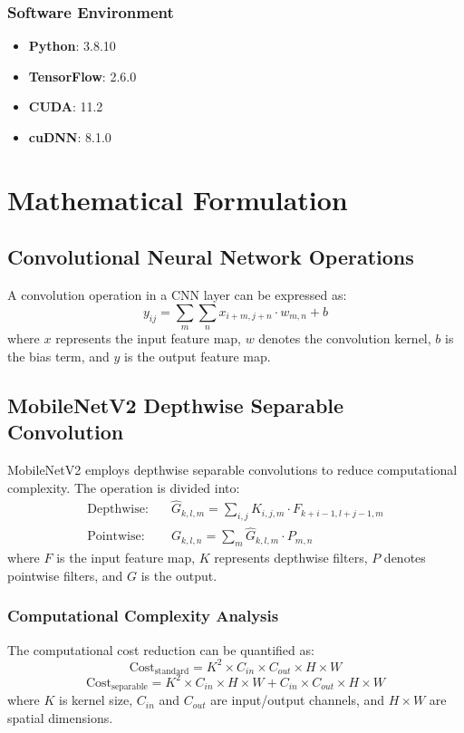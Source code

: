 \documentclass[conference,10pt,letterpaper]{IEEEtran}
\begin{document}
\subsubsection{Software Environment}
\begin{itemize}
\item \textbf{Python}: 3.8.10
\item \textbf{TensorFlow}: 2.6.0
\item \textbf{CUDA}: 11.2
\item \textbf{cuDNN}: 8.1.0
\end{itemize}

\section{Mathematical Formulation}

\subsection{Convolutional Neural Network Operations}

A convolution operation in a CNN layer can be expressed as:
\begin{equation}
y_{ij} = \sum_{m}\sum_{n} x_{i+m,j+n} \cdot w_{m,n} + b
\end{equation}
where $x$ represents the input feature map, $w$ denotes the convolution kernel, $b$ is the bias term, and $y$ is the output feature map.

\subsection{MobileNetV2 Depthwise Separable Convolution}

MobileNetV2 employs depthwise separable convolutions to reduce computational complexity. The operation is divided into:
\begin{align}
\text{Depthwise:} \quad & \hat{G}_{k,l,m} = \sum_{i,j} K_{i,j,m} \cdot F_{k+i-1,l+j-1,m} \\
\text{Pointwise:} \quad & G_{k,l,n} = \sum_{m} \hat{G}_{k,l,m} \cdot P_{m,n}
\end{align}
where $F$ is the input feature map, $K$ represents depthwise filters, $P$ denotes pointwise filters, and $G$ is the output.

\subsubsection{Computational Complexity Analysis}
The computational cost reduction can be quantified as:
\begin{equation}
\text{Cost}_{\text{standard}} = K^2 \times C_{in} \times C_{out} \times H \times W
\end{equation}
\begin{equation}
\text{Cost}_{\text{separable}} = K^2 \times C_{in} \times H \times W + C_{in} \times C_{out} \times H \times W
\end{equation}
where $K$ is kernel size, $C_{in}$ and $C_{out}$ are input/output channels, and $H \times W$ are spatial dimensions.
\end{document}
